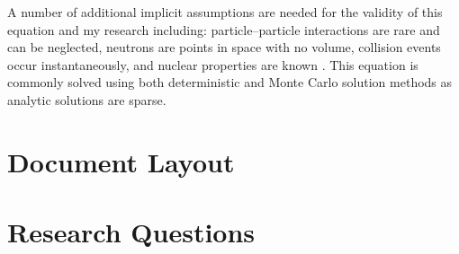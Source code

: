 A number of additional implicit assumptions are needed for the validity of this equation and my research including: particle--particle interactions are rare and can be neglected, neutrons are points in space with no volume, collision events occur instantaneously, and nuclear properties are known \cite{lewis_computational_1984}.
This equation is commonly solved using both deterministic and Monte Carlo solution methods as analytic solutions are sparse.


\section{Document Layout}



\section{Research Questions}